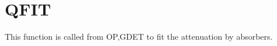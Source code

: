 \section{QFIT}
\label{sect:qfit}

\noindent This function is called from OP,GDET to fit the attenuation by
absorbers.\\
